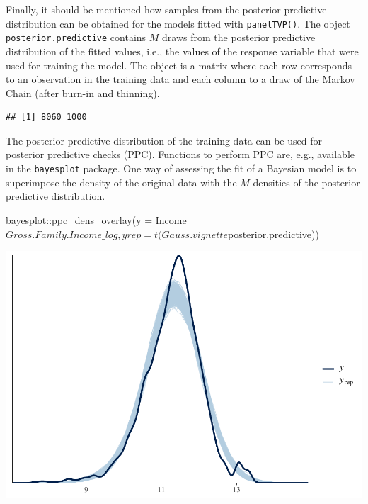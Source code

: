 \documentclass[a4paper, preprint, 3p,
authoryear]{elsarticle} %
\newenvironment{Shaded}{\begin{snugshade}}{\end{snugshade}}
\newcommand{\NormalTok}[1]{#1}
\newcommand{\pandocbounded}[1]{#1}
\begin{document}
Finally, it should be mentioned how samples from the posterior
predictive distribution can be obtained for the models fitted with
\texttt{panelTVP()}. The object \texttt{posterior.predictive} contains
\(M\) draws from the posterior predictive distribution of the fitted
values, i.e., the values of the response variable that were used for
training the model. The object is a matrix where each row corresponds to
an observation in the training data and each column to a draw of the
Markov Chain (after burn-in and thinning).

\begin{Shaded}
\end{Shaded}

\begin{verbatim}
## [1] 8060 1000
\end{verbatim}

The posterior predictive distribution of the training data can be used
for posterior predictive checks (PPC). Functions to perform PPC are,
e.g., available in the \texttt{bayesplot} package. One way of assessing
the fit of a Bayesian model is to superimpose the density of the
original data with the \(M\) densities of the posterior predictive
distribution.

\begin{Shaded}
\begin{Highlighting}[]
\NormalTok{bayesplot::ppc\_dens\_overlay(y = Income$Gross.Family.Income\_log,}
\NormalTok{                            yrep = t(Gauss.vignette$posterior.predictive))}
\end{Highlighting}
\end{Shaded}

\pandocbounded{\includegraphics[keepaspectratio]{Vignette-for-panelTVP_files/figure-latex/unnamed-chunk-24-1.pdf}}
\end{document}
